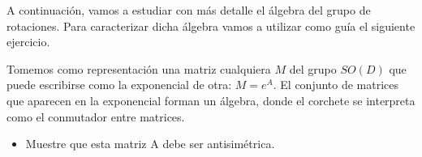 A continuación, vamos a estudiar con más detalle el álgebra del grupo de rotaciones. Para caracterizar dicha álgebra vamos a utilizar como guía el siguiente ejercicio.
\vspace{0.2cm}
\begin{exercise}
    Tomemos como representación una matriz cualquiera $M$ del grupo $SO(D)$ que puede escribirse como la exponencial de otra: $M = e^{A}$. El conjunto de matrices que aparecen en la exponencial forman un álgebra, donde el corchete se interpreta como el conmutador entre matrices.
    \begin{itemize}
        \item Muestre que esta matriz A debe ser antisimétrica.
    \end{itemize}
    \label{primerejercicio}
\end{exercise}

